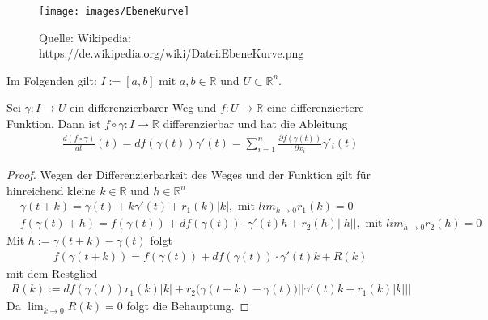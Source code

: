 \begin{figure}[H]
      \centering
    \texttt{[image: images/EbeneKurve]}
      \caption{Quelle: Wikipedia: https://de.wikipedia.org/wiki/Datei:EbeneKurve.png}
\end{figure}
Im Folgenden gilt: $I := [a, b]$ mit $a,b \in \mathbb{R}$ und $U \subset \mathbb{R}^n$.
\begin{Satz}
Sei $\gamma: I \to U$ ein differenzierbarer Weg und $f: U \to \mathbb{R}$ eine differenziertere Funktion. Dann ist $f \circ \gamma : I \to \mathbb{R}$ differenzierbar und hat die Ableitung
\begin{align*}
\frac{d(f \circ \gamma)}{dt}(t) = df(\gamma(t))\gamma'(t) = \sum_{i=1}^n  \frac{\partial f (\gamma(t))}{\partial x_i} \gamma'_i(t)
\end{align*} 
\end{Satz}


\begin{proof}
Wegen der Differenzierbarkeit des Weges und der Funktion gilt für hinreichend kleine $k \in \mathbb{R}$ und $h \in \mathbb{R}^n$
\begin{align*}
& \gamma (t + k) = \gamma(t) + k \gamma'(t) + r_1 (k) |k|, \text{ mit } lim_{k \to 0} r_1(k) = 0  \\
& f(\gamma(t) + h) = f(\gamma(t)) + df(\gamma(t)) \cdot \gamma'(t) h +  r_2 (h)  ||h|| , \text{ mit } lim_{h \to 0} r_2(h) = 0 
\end{align*} 
 Mit $h:= \gamma(t + k) - \gamma(t)$ folgt
\begin{align*}
f(\gamma(t + k)) = f(\gamma(t)) + df(\gamma(t)) \cdot \gamma'(t) k +  R(k)
\end{align*}  
mit dem Restglied
\begin{align*}
R(k) := df(\gamma(t)) r_1(k) |k| + r_2 \bigl( \gamma (t + k) - \gamma(t) \bigr) ||\gamma'(t) k + r_1(k) |k| || 
\end{align*}  
Da $\lim_{k \to 0} R(k) = 0$ folgt die Behauptung.
\end{proof}




